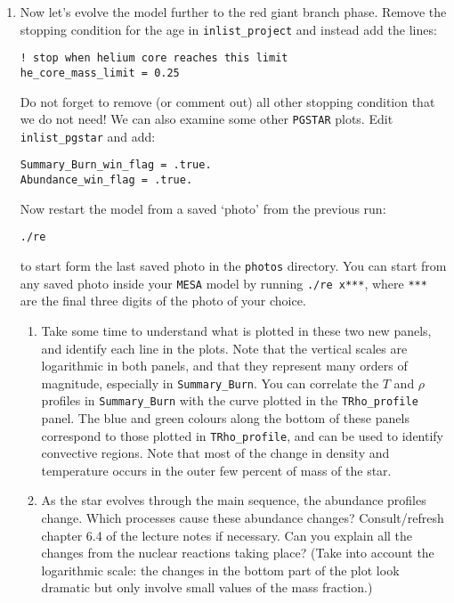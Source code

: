 \documentclass[11pt,a4paper]{article}
\begin{document}
\begin{enumerate}
\item Now let's evolve the model further to the red giant branch phase. Remove the stopping condition for the age in \verb|inlist_project| and instead add the lines:
\begin{lstlisting}
! stop when helium core reaches this limit
he_core_mass_limit = 0.25
\end{lstlisting}

Do not forget to remove (or comment out) all other stopping condition that we do not need!
 We can also examine some other \texttt{PGSTAR} plots. Edit \verb|inlist_pgstar| and add:
\begin{lstlisting}
Summary_Burn_win_flag = .true.
Abundance_win_flag = .true.
\end{lstlisting}

Now restart the model from a saved `photo' from the previous run:
\begin{lstlisting}
./re 
\end{lstlisting}%
to start form the last saved photo in the \texttt{photos} directory. 
You can start from any saved photo inside your \texttt{MESA} model by running \verb|./re x***|, where \verb|***| are the final three digits of the photo of your choice.

\begin{enumerate}
\item Take some time to understand what is plotted in these two new panels, and identify each line in the plots. Note that the vertical scales are logarithmic in both panels, and that they represent many orders of magnitude, especially in \verb|Summary_Burn|. You can correlate the $T$ and $\rho$ profiles in \verb|Summary_Burn| with the curve plotted in the \verb|TRho_profile| panel.  The blue and green colours along the bottom of these panels correspond to those plotted in \verb|TRho_profile|, and can be used to identify convective regions. Note that most of the change in density and temperature occurs in the outer few percent of mass of the star.

\item As the star evolves through the main sequence, the abundance profiles change. Which processes cause these abundance changes? Consult/refresh chapter 6.4 of the lecture notes if necessary. Can you explain all the changes from the nuclear reactions taking place? (Take into account the logarithmic scale: the changes in the bottom part of the plot look dramatic but only involve small values of the mass fraction.)


\end{enumerate}
\end{enumerate}
\end{document}
